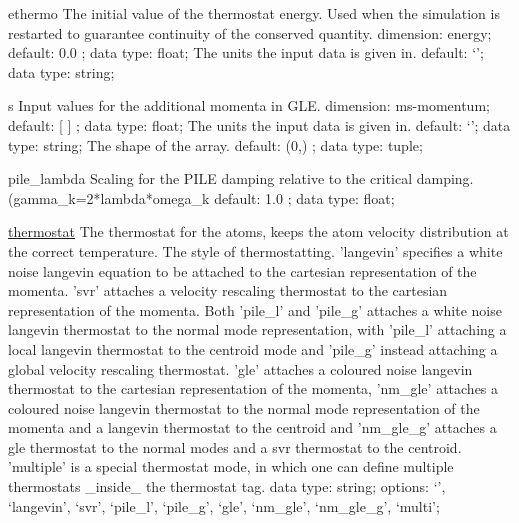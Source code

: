 \begin{ipifield}{}
\begin{ipifield}{ethermo}
{The initial value of the thermostat energy. Used when the simulation is restarted to guarantee continuity of the conserved quantity.}%
{dimension: energy; default:  0.0 ; data type: float; }%
{%
{The units the input data is given in.}%
{default: `'; data type: string; }%
}
\end{ipifield}
\begin{ipifield}{s}%
{Input values for the additional momenta in GLE.}%
{dimension: ms-momentum; default:  [ ] ; data type: float; }%
{%
{The units the input data is given in.}%
{default: `'; data type: string; }%
%
{The shape of the array.}%
{default:  (0,) ; data type: tuple; }%
}
\end{ipifield}
\begin{ipifield}{pile\_lambda}%
{Scaling for the PILE damping relative to the critical damping. (gamma\_k=2*lambda*omega\_k}%
{default:  1.0 ; data type: float; }%
{}
\end{ipifield}
\begin{ipifield}{\hyperref[THERMOSTATS]{thermostat}}%
{The thermostat for the atoms, keeps the atom velocity distribution at the correct temperature.}%
{}%
{%
{The style of thermostatting. 'langevin' specifies a white noise langevin equation to be attached to the cartesian representation of the momenta. 'svr' attaches a velocity rescaling thermostat to the cartesian representation of the momenta. Both 'pile\_l' and 'pile\_g' attaches a white noise langevin thermostat to the normal mode representation, with 'pile\_l' attaching a local langevin thermostat to the centroid mode and 'pile\_g' instead attaching a global velocity rescaling thermostat. 'gle' attaches a coloured noise langevin thermostat to the cartesian representation of the momenta, 'nm\_gle' attaches a coloured noise langevin thermostat to the normal mode representation of the momenta and a langevin thermostat to the centroid and 'nm\_gle\_g' attaches a gle thermostat to the normal modes and a svr thermostat to the centroid.  'multiple' is a special thermostat mode, in which one can define multiple thermostats \_inside\_ the thermostat tag.}%
{data type: string; options: `', `langevin', `svr', `pile\_l', `pile\_g', `gle', `nm\_gle', `nm\_gle\_g', `multi'; }%
}
\end{ipifield}
\end{ipifield}

